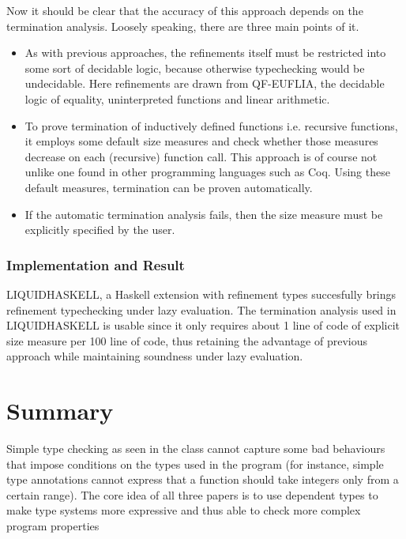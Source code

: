\documentclass[a4paper,UKenglish]{lipics-v2016}
\begin{document}
      Now it should be clear that the accuracy of this approach depends on the
      termination analysis.  Loosely speaking, there are three main points of
      it.
      \begin{itemize}
        \item As with previous approaches, the refinements itself must be
          restricted into some sort of decidable logic, because otherwise
          typechecking would be undecidable.  Here refinements are drawn from
          QF-EUFLIA, the decidable logic of equality, uninterpreted
          functions and linear arithmetic.
        \item To prove termination of inductively defined functions i.e.
          recursive functions, it employs some default size measures and check
          whether those measures decrease on each (recursive) function call.
          This approach is of course not unlike one found in other programming
          languages such as Coq. Using these default measures, termination can
          be proven automatically.
        \item If the automatic termination analysis fails, then the size
          measure must be explicitly specified by the user.
      \end{itemize}

    \subsubsection{Implementation and Result}

      LIQUIDHASKELL, a Haskell extension with refinement types succesfully
      brings refinement typechecking under lazy evaluation.  The termination
      analysis used in LIQUIDHASKELL is usable since it only requires about 1
      line of code of explicit size measure per 100 line of code, thus
      retaining the advantage of previous approach while maintaining soundness
      under lazy evaluation.

\section{Summary}

Simple type checking as seen in the class cannot capture some bad behaviours
that impose conditions on the types used in the program (for instance, simple
type annotations cannot express that a function should take integers only from
a certain range). The core idea of all three papers is to use dependent types
to make type systems more expressive and thus able to check more complex
program properties
\end{document}

